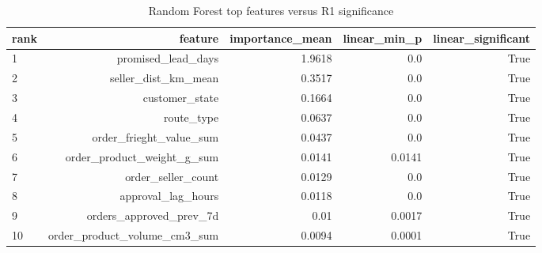 \begin{table}[htbp]
\centering
\small
\caption{Random Forest top features versus R1 significance}
\begin{tabular}{lrrrr}
\toprule
rank & feature & importance\_mean & linear\_min\_p & linear\_significant \\
\midrule
1 & promised\_lead\_days & 1.9618 & 0.0 & True \\
2 & seller\_dist\_km\_mean & 0.3517 & 0.0 & True \\
3 & customer\_state & 0.1664 & 0.0 & True \\
4 & route\_type & 0.0637 & 0.0 & True \\
5 & order\_frieght\_value\_sum & 0.0437 & 0.0 & True \\
6 & order\_product\_weight\_g\_sum & 0.0141 & 0.0141 & True \\
7 & order\_seller\_count & 0.0129 & 0.0 & True \\
8 & approval\_lag\_hours & 0.0118 & 0.0 & True \\
9 & orders\_approved\_prev\_7d & 0.01 & 0.0017 & True \\
10 & order\_product\_volume\_cm3\_sum & 0.0094 & 0.0001 & True \\
\bottomrule
\end{tabular}
\par\smallskip\begin{minipage}{\linewidth}\footnotesize \end{minipage}
\end{table}

